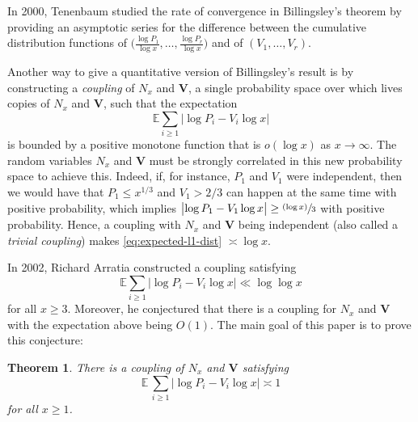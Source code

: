 \documentclass[10pt]{amsart}
\newcommand{\bV}{{\boldsymbol V}}
\newcommand{\psfrac}[2]{\sfrac{(#1)}{#2}}
\newcommand{\EE}{\mathbb{E}}
\newcommand{\bg}{\big}
\theoremstyle{plain}
\newtheorem{theo}{Theorem}
\theoremstyle{definition}
\begin{document}
In 2000, Tenenbaum \cite{Tenenbaum00} studied the rate of convergence in Billingsley's theorem by providing an asymptotic series for the difference between the cumulative distribution functions of $\bg(\tfrac{\log P_1}{\log x}, \ldots, \tfrac{\log P_r}{\log x}\bg)$ and of $(V_1, \ldots, V_r)$.

Another way to give a quantitative version of Billingsley's result is by constructing a \emph{coupling} of $N_x$ and $\bV$, \ie a single probability space over which lives copies of $N_x$ and $\bV$, such that the expectation
\begin{equation}
\label{eq:expected-l1-dist}
\EE\sum_{i \ge 1} \bg|{\log P_i - V_i\log x}\bg|
\end{equation}
is bounded by a positive monotone function that is $o(\log x)$ as $x \to \infty$. The random variables $N_x$ and $\bV$ must be strongly correlated in this new probability space to achieve this. Indeed, if, for instance, $P_1$ and $V_1$ were independent, then we would have that $P_1\le x^{1/3}$ and $V_1>2/3$ can happen at the same time with positive probability, which implies $\bg|{\log P_1 - V_1\log x}\bg| \ge \psfrac{\log x}{3}$ with positive probability. Hence, a coupling with $N_x$ and $\bV$ being independent (also called a \emph{trivial coupling}) makes \eqref{eq:expected-l1-dist} $\asymp \log x$.

In 2002, Richard Arratia \cite{Arratia02} constructed a coupling satisfying
\begin{equation}
\label{eq:arratia02-result}
\EE\sum_{i \ge 1} \bg|{\log P_i - V_i\log x}\bg| \ll \log\!\log x
\end{equation}
for all $x \ge 3$. Moreover, he conjectured that there is a coupling for $N_x$ and $\bV$ with the expectation above being $O(1)$. The main goal of this paper is to prove this conjecture:

\begin{theo}
\label{thm:coupling-ub}
There is a coupling of $N_x$ and $\bV$ satisfying
\[
\EE\, \sum_{i \ge 1} \bg|{\log P_i - V_i\log x}\bg| \asymp 1
\]
for all $x \ge 1$.
\end{theo}
\end{document}
